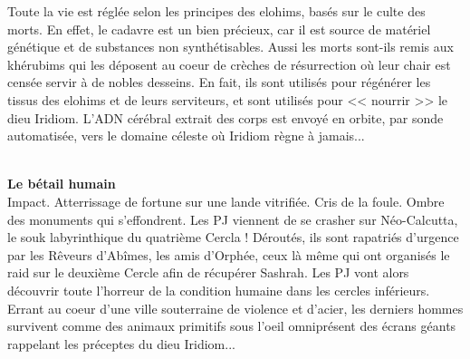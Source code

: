 \documentclass[11pt,twoside,a4paper]{book}
\begin{document}
{{\begin{minipage}[ht]{0.90\textwidth}
	Toute la vie est r{\'e}gl{\'e}e selon les principes des elohims, bas{\'e}s sur le culte des morts. En effet, le cadavre est un bien pr{\'e}cieux, car il est source de mat{\'e}riel g{\'e}n{\'e}tique et de substances non synth{\'e}tisables. Aussi les morts sont-ils remis aux kh{\'e}rubims qui les d{\'e}posent au coeur de cr{\`e}ches de r{\'e}surrection o{\`u} leur chair est cens{\'e}e servir {\`a} de nobles desseins. En fait, ils sont utilis{\'e}s pour r{\'e}g{\'e}n{\'e}rer les tissus des elohims et de leurs serviteurs, et sont utilis{\'e}s pour << nourrir >> le dieu Iridiom. L'ADN c{\'e}r{\'e}bral extrait des corps est envoy{\'e} en orbite, par sonde automatis{\'e}e, vers le domaine c{\'e}leste o{\`u} Iridiom r{\`e}gne {\`a} jamais...
\end{minipage} } }%

~\\

\textbf{\large Le b{\'e}tail humain}~\\

Impact. Atterrissage de fortune sur une lande vitrifi{\'e}e. Cris de la foule. Ombre des monuments qui s'effondrent. Les PJ viennent de se crasher sur N{\'e}o-Calcutta, le souk labyrinthique du quatri{\`e}me Cercla ! D{\'e}rout{\'e}s, ils sont rapatri{\'e}s d'urgence par les R{\^e}veurs d'Ab{\^i}mes, les amis d'Orph{\'e}e, ceux l{\`a} m{\^e}me qui ont organis{\'e}s le raid sur le deuxi{\`e}me Cercle afin de r{\'e}cup{\'e}rer Sashrah. Les PJ vont alors d{\'e}couvrir toute l'horreur de la condition humaine dans les cercles inf{\'e}rieurs. Errant au coeur d'une ville souterraine de violence et d'acier, les derniers hommes survivent comme des animaux primitifs sous l'oeil omnipr{\'e}sent des {\'e}crans g{\'e}ants rappelant les pr{\'e}ceptes du dieu Iridiom...~\\
\end{document}
